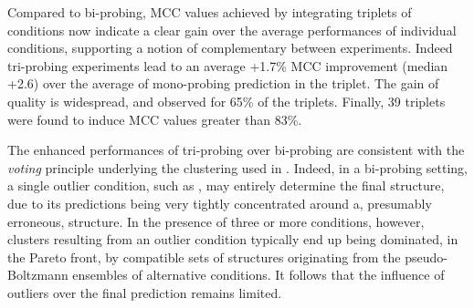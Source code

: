 \documentclass[a4,center,fleqn]{NAR}
\begin{document}
Compared to bi-probing, MCC values achieved by integrating triplets of conditions now indicate a clear gain over the average performances of individual conditions, supporting a notion of complementary between experiments. Indeed tri-probing experiments lead to an average +1.7\% MCC improvement (median +2.6) over the average of mono-probing prediction in the triplet. The gain of quality is widespread, and observed for 65\% of the triplets. Finally, 39 triplets were found to induce MCC values greater than 83\%.

The enhanced performances of tri-probing over bi-probing are consistent with the \emph{voting} principle underlying the clustering used in \OurTool. Indeed, in a bi-probing setting, a single outlier condition, such as \NAICE, may entirely determine the final structure, due to its predictions being very tightly concentrated around a, presumably erroneous, structure. In the presence of three or more conditions, however, clusters resulting from an outlier condition typically end up being dominated, in the Pareto front, by compatible sets of structures originating from the pseudo-Boltzmann ensembles of alternative conditions. It follows that the influence of outliers over the final prediction remains limited.

\end{document}
